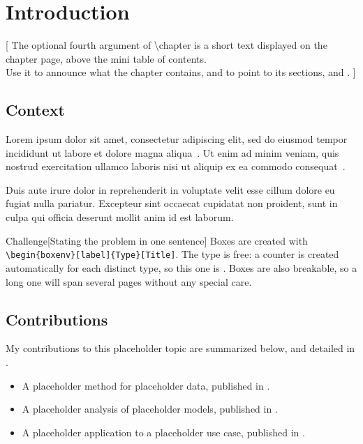 \chapter[introduction]{Introduction}
 [
  The optional fourth argument of \textbackslash chapter is a short text displayed on the chapter page, above the mini table of contents. \\
  Use it to announce what the chapter contains, and to point to its sections, \eg {} and .
 ]

\section[introduction_context]{Context}

Lorem ipsum dolor sit amet, consectetur adipiscing elit, sed do eiusmod tempor incididunt ut labore et dolore magna aliqua~\cite{ipsum1998foundational}.
Ut enim ad minim veniam, quis nostrud exercitation ullamco laboris nisi ut aliquip ex ea commodo consequat~\cite{tempor2009textbook}.

Duis aute irure dolor in reprehenderit in voluptate velit esse cillum dolore eu fugiat nulla pariatur.
Excepteur sint occaecat cupidatat non proident, sunt in culpa qui officia deserunt mollit anim id est laborum.

\begin{boxenv}{Challenge}[Stating the problem in one sentence]
    Boxes are created with \texttt{\textbackslash begin\{boxenv\}[label]\{Type\}[Title]}.
    The type is free: a counter is created automatically for each distinct type, so this one is .
    Boxes are also breakable, so a long one will span several pages without any special care.
\end{boxenv}

\section[introduction_contributions]{Contributions}

My contributions to this placeholder topic are summarized below, and detailed in .

\begin{itemize}
    \item A placeholder method for placeholder data, published in \cite{lastname2021journal}.
    \item A placeholder analysis of placeholder models, published in \cite{lastname2022conference}.
    \item A placeholder application to a placeholder use case, published in \cite{lastname2019chapter}.
\end{itemize}

